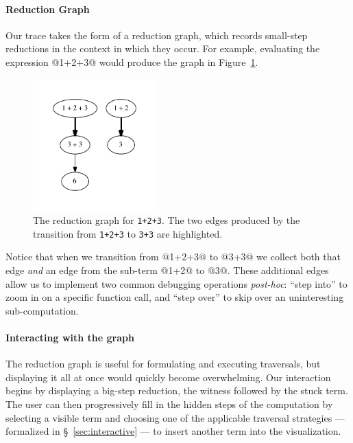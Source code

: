 \paragraph{Reduction Graph}
Our trace takes the form of a reduction graph, which records small-step
reductions in the context in which they occur.
%
%
For example, evaluating the expression @1+2+3@ would produce the
graph in Figure~\ref{fig:simple-reduction-hi}.
%
\begin{figure}[t]
  \centering
  \includegraphics[height=2in]{simple.pdf}
  \caption{The reduction graph for \texttt{1+2+3}. The two edges
    produced by the transition from \texttt{1+2+3} to \hbox{\texttt{3+3}}
    are highlighted.}
\label{fig:simple-reduction-hi}
\end{figure}
%
Notice that when we transition from @1+2+3@ to @3+3@ we collect
both that edge \emph{and} an edge from the sub-term @1+2@ to @3@.
%
These additional edges allow us to implement two common debugging
operations \emph{post-hoc}: ``step into'' to zoom in on a specific
function call, and ``step over'' to skip over an uninteresting
sub-computation.

\paragraph{Interacting with the graph}
The reduction graph is useful for formulating and executing traversals,
but displaying it all at once would quickly become overwhelming.
%
Our interaction begins by displaying a big-step reduction, \ie the
witness followed by the stuck term.
%
The user can then progressively fill in the hidden steps of the
computation by selecting a visible term and choosing one of the
applicable traversal strategies --- formalized in
\S~\ref{sec:interactive} --- to insert another term into the
visualization.

